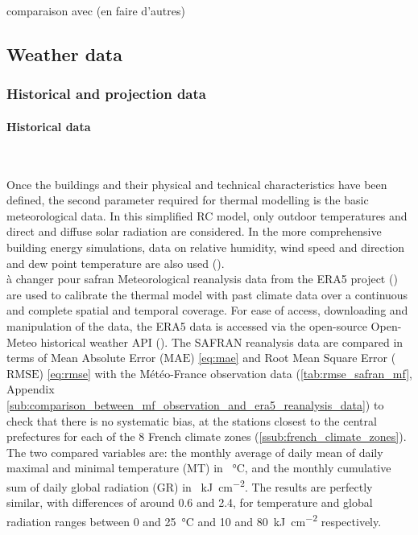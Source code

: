 \documentclass[11pt]{article}
\begin{document}
        comparaison avec \textcite{pomianowski_method_2023} (en faire d'autres)
    


    \clearpage
    \subsection{Weather data} %
    \label{sub:weather_data}

        
        \subsubsection{Historical and projection data} %
        \label{ssub:historical_data}
        
        \paragraph{Historical data}\mbox{}\\ %
        \label{par:historical_data}
        
        Once the buildings and their physical and technical characteristics have been defined, the second parameter required for thermal modelling is the basic meteorological data. In this simplified RC model, only outdoor temperatures and direct and diffuse solar radiation are considered. In the more comprehensive building energy simulations, data on relative humidity, wind speed and direction and dew point temperature are also used (\cite{bhandari_evaluation_2012}).\\

        {\color{red} à changer pour safran}
        Meteorological reanalysis data from the ERA5 project (\cite{hersbach_era5_2020}) are used to calibrate the thermal model with past climate data over a continuous and complete spatial and temporal coverage. For ease of access, downloading and manipulation of the data, the ERA5 data is accessed via the open-source Open-Meteo historical weather API (\cite{zippenfenig_open-meteocom_2024}). The SAFRAN reanalysis data are compared in terms of Mean Absolute Error ($\mathrm{MAE}$) \eqref{eq:mae} and Root Mean Square Error ($\mathrm{RMSE}$) \eqref{eq:rmse} with the Météo-France observation data (\ref{tab:rmse_safran_mf}, Appendix \ref{sub:comparison_between_mf_observation_and_era5_reanalysis_data}) to check that there is no systematic bias, at the stations closest to the central prefectures for each of the 8 French climate zones (\ref{ssub:french_climate_zones}). The two compared variables are: the monthly average of daily mean of daily maximal and minimal temperature (MT) in \SI{}{\celsius}, and the monthly cumulative sum of daily global radiation (GR) in \SI{}{\kilo\joule\per\square\centi\meter}. The results are perfectly similar, with differences of around \num{0.6} and \num{2.4}, for temperature and global radiation ranges between 0 and \SI{25}{\celsius} and 10 and \SI{80}{\kilo\joule\per\square\centi\meter} respectively. 
\end{document}
